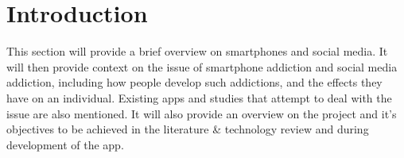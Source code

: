\documentclass[12pt]{article}
\makeatletter
\newcommand{\studentId}{S2213159}
\newcommand{\degree}{BSc (Hons) Computing}
\newcommand{\supervisor}{Dr. Mario Mata}
\newcommand{\secondmarker}{Prof. Hua Tianfield}
\newcommand{\wordcount}{4394}
\newcommand{\module}{MHW225671}
\let\thedate\@date
\makeatother
\begin{document}
\begin{titlepage}
 
	\vfill
	
\end{titlepage}




\newpage
\tableofcontents
\listoftables

\newpage

\section{Introduction}
This section will provide a brief overview on smartphones and social media. It will then provide context on the 
issue of smartphone addiction and social media addiction, including how people develop such addictions, and the 
effects they have on an individual. Existing apps and studies that attempt to deal with the issue are also 
mentioned. It will also provide an overview on the project and it's objectives to be achieved in the literature 
\& technology review and during development of the app.




\end{document}

